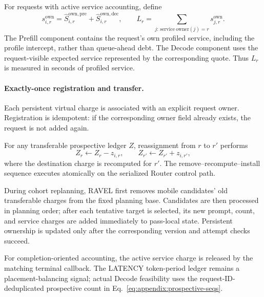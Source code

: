 \documentclass[letterpaper,twocolumn,10pt]{article}
\begin{document}
For requests with active service accounting, define
\begin{equation}
    s^{\mathrm{own}}_{i,r}
    =
    \widehat{S}^{\mathrm{own,pre}}_{i,r}
    +
    \widehat{S}^{\mathrm{own,dec}}_{i,r},
    \qquad
    L_r
    =
    \sum_{j:\,\mathrm{service\ owner}(j)=r}
       s^{\mathrm{own}}_{j,r}.
    \label{eq:appendix:service-ledger}
\end{equation}
The Prefill component contains the request's own profiled service, including
the profile intercept, rather than queue-ahead debt.
The Decode component uses the request-visible expected service represented by
the corresponding quote.
Thus $L_r$ is measured in seconds of profiled service.

\paragraph{Exactly-once registration and transfer.}
Each persistent virtual charge is associated with an explicit request owner.
Registration is idempotent: if the corresponding owner field already exists,
the request is not added again.

For any transferable prospective ledger $Z$, reassignment from $r$ to $r'$
performs
\begin{equation}
    Z_r \leftarrow Z_r-z_{i,r},
    \qquad
    Z_{r'} \leftarrow Z_{r'}+z_{i,r'},
    \label{eq:appendix:account-transfer}
\end{equation}
where the destination charge is recomputed for $r'$.
The remove--recompute--install sequence executes atomically on the serialized
Router control path.

During cohort replanning, RAVEL first removes mobile candidates' old
transferable charges from the fixed planning base.
Candidates are then processed in planning order; after each tentative target
is selected, its new prompt, count, and service charges are added immediately
to pass-local state.
Persistent ownership is updated only after the corresponding version and
attempt checks succeed.

For completion-oriented accounting, the active service charge is released by
the matching terminal callback.
The LATENCY token-period ledger remains a placement-balancing signal; actual
Decode feasibility uses the request-ID-deduplicated prospective count in
Eq.~\ref{eq:appendix:prospective-seqs}.
\end{document}
